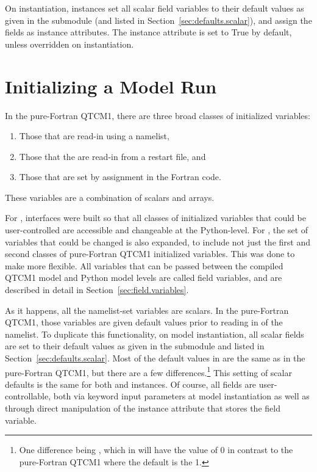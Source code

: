 On instantiation,  instances set all scalar field
variables to their default values as given in the submodule
 (and listed in Section~\ref{sec:defaults.scalar}),
and assign the fields as instance attributes.  The instance attribute
 is set to True by default, unless
overridden on instantiation.




\section{Initializing a Model Run}

In the pure-Fortran QTCM1, there are three broad
classes of initialized variables:
\begin{enumerate}
\item Those that are read-in using a namelist, 
\item Those that the are read-in from a restart file, and
\item Those that are set by assignment in the Fortran code.  
\end{enumerate}
These variables are a combination of scalars and arrays.

For , interfaces were built so that all classes of
initialized variables that could be user-controlled are accessible
and changeable at the Python-level.  For ,
the set of variables that could be changed is also expanded, to
include not just the first and second classes of pure-Fortran
QTCM1 initialized variables.  This was done to make 
more flexible.  All variables that can be passed between the
compiled QTCM1 model and Python model levels are called
field variables, and are described in detail in
Section~\ref{sec:field.variables}.

As it happens, all the namelist-set variables are scalars.  In the
pure-Fortran QTCM1, those variables are given default values prior
to reading in of the namelist.  To duplicate this functionality,
on model instantiation, all scalar fields are set to their default
values as given in the submodule  and listed in
Section~\ref{sec:defaults.scalar}.  Most of the default values in
 are the same as in the pure-Fortran QTCM1, but
there are a few differences.\footnote%
	{One difference being , which in  
	will have the value of 0 in contrast to the pure-Fortran 
	QTCM1 where the default is the 1.}
This setting of scalar defaults is the same for both
 and
 instances.
Of course, all
 fields are user-controllable, both via keyword input
parameters at model instantiation as well as through direct
manipulation of the instance attribute that stores the field variable.

